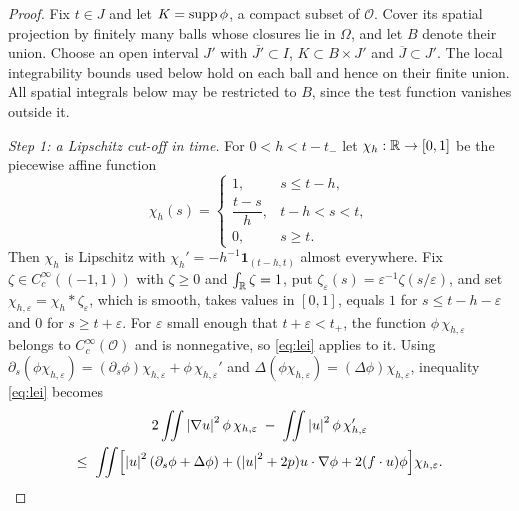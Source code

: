 \documentclass[11pt,reqno]{amsart}
\begin{document}
\begin{proof}
Fix $t\in J$ and let $K=\operatorname{supp}\phi$, a compact subset of $\mathcal{O}$.
Cover its spatial projection by finitely many balls whose closures lie in
$\Omega$, and let $B$ denote their union. Choose an open interval $J'$
with $\overline{J'}\subset I$, $K\subset B\times J'$ and
$\overline{J}\subset J'$. The local integrability bounds used below hold
on each ball and hence on their finite union. All spatial integrals below
may be restricted to $B$, since the test function vanishes outside it.

\emph{Step 1: a Lipschitz cut-off in time.} For $0<h<t-t_{-}$ let
$\chi_{h}:\mathbb{R}\to[0,1]$ be the piecewise affine function
\begin{equation}\label{eq:time-cutoff}
  \chi_{h}(s)=\begin{cases}
    1,& s\le t-h,\\[2pt]
    \dfrac{t-s}{h},& t-h<s<t,\\[6pt]
    0,& s\ge t .
  \end{cases}
\end{equation}
Then $\chi_{h}$ is Lipschitz with
$\chi_{h}'=-h^{-1}\mathbf{1}_{(t-h,t)}$ almost everywhere. Fix
$\zeta\in C_{c}^{\infty}((-1,1))$ with $\zeta\ge0$ and $\int_{\mathbb{R}}\zeta=1$, put
$\zeta_{\varepsilon}(s)=\varepsilon^{-1}\zeta(s/\varepsilon)$, and set
$\chi_{h,\varepsilon}=\chi_{h}*\zeta_{\varepsilon}$, which is smooth, takes
values in $[0,1]$, equals $1$ for $s\le t-h-\varepsilon$ and $0$ for
$s\ge t+\varepsilon$. For $\varepsilon$ small enough that
$t+\varepsilon<t_{+}$, the function
$\phi\,\chi_{h,\varepsilon}$ belongs to $C_{c}^{\infty}(\mathcal{O})$ and is
nonnegative, so \eqref{eq:lei} applies to it. Using
$\partial_{s}(\phi\chi_{h,\varepsilon})
 =(\partial_{s}\phi)\chi_{h,\varepsilon}+\phi\,\chi_{h,\varepsilon}'$
and $\Delta(\phi\chi_{h,\varepsilon})=(\Delta\phi)\chi_{h,\varepsilon}$,
inequality \eqref{eq:lei} becomes
\begin{multline}\label{eq:lei-cut}
  2\iint\left\lvert \nabla u \right\rvert^{2}\phi\,\chi_{h,\varepsilon}
  \;-\;\iint\left\lvert u \right\rvert^{2}\phi\,\chi_{h,\varepsilon}'\\
  \le\;\iint\Bigl[\left\lvert u \right\rvert^{2}(\partial_{s}\phi+\Delta\phi)
    +(\left\lvert u \right\rvert^{2}+2p)u\cdot\nabla\phi+2(f\cdot u)\phi\Bigr]\chi_{h,\varepsilon}.
\end{multline}


\end{proof}
\end{document}
